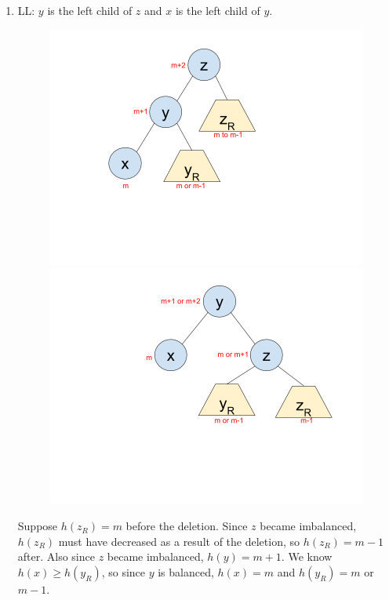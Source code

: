 \documentclass[12pt]{article}
\begin{document}
\begin{enumerate}
  \item LL: $y$ is the left child of $z$ and $x$ is the left child of $y$.

  \begin{figure}[h]
    \centering
    \includegraphics[trim=50 50 150 40, clip,scale=0.33]{pics/avl_delete_ll1}
    \includegraphics[trim=250 50 50 40, clip,scale=0.33]{pics/avl_delete_ll2}
  \end{figure}

  Suppose $h(z_R) = m$ before the deletion. Since $z$ became imbalanced, $h(z_R)$ must have decreased as a result of the deletion, so $h(z_R) = m-1$ after. Also since $z$ became imbalanced, $h(y) = m+1$. We know $h(x) \geq h(y_R)$, so since $y$ is balanced, $h(x) = m$ and $h(y_R) = m$ or $m-1$.


\end{enumerate}
\end{document}
